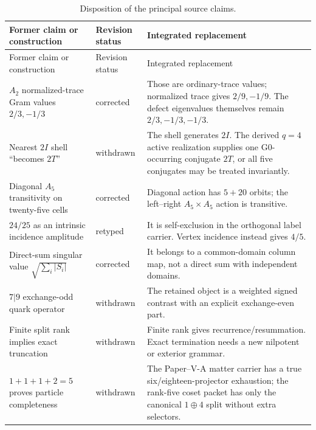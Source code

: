 \documentclass[12pt,a4paper]{article}
\begin{document}
\begin{longtable}{@{}L{0.29\textwidth}L{0.19\textwidth}
L{0.44\textwidth}@{}}
\caption{Disposition of the principal source claims.}
\label{p6:tab:source-disposition}\\
\toprule
Former claim or construction & Revision status & Integrated replacement \\
\midrule
\endfirsthead
\toprule
Former claim or construction & Revision status & Integrated replacement \\
\midrule
\endhead
\bottomrule
\endlastfoot

\(A_2\) normalized-trace Gram values \(2/3,-1/3\)
& corrected
& Those are ordinary-trace values; normalized trace gives \(2/9,-1/9\).
The defect eigenvalues themselves remain \(2/3,-1/3,-1/3\).\\

Nearest \(2I\) shell ``becomes \(2T\)''
& withdrawn
& The shell generates \(2I\).  The derived \(q=4\) active realization
supplies one G0-occurring conjugate \(2T\), or all five conjugates may be
treated invariantly.\\

Diagonal \(A_5\) transitivity on twenty-five cells
& corrected
& Diagonal action has \(5+20\) orbits; the left--right
\(A_5\times A_5\) action is transitive.\\

\(24/25\) as an intrinsic incidence amplitude
& retyped
& It is self-exclusion in the orthogonal label carrier.  Vertex incidence
instead gives \(4/5\).\\

Direct-sum singular value \(\sqrt{\sum_i|S_i|}\)
& corrected
& It belongs to a common-domain column map, not a direct sum with independent
domains.\\

\(7|9\) exchange-odd quark operator
& withdrawn
& The retained object is a weighted signed contrast with an explicit
exchange-even part.\\

Finite split rank implies exact truncation
& withdrawn
& Finite rank gives recurrence/resummation.  Exact termination needs a new
nilpotent or exterior grammar.\\

\(1+1+1+2=5\) proves particle completeness
& withdrawn
& The Paper--V-A matter carrier has a true six/eighteen-projector exhaustion;
the rank-five coset packet has only the canonical \(1\oplus4\) split without
extra selectors.\\


\end{longtable}
\end{document}
